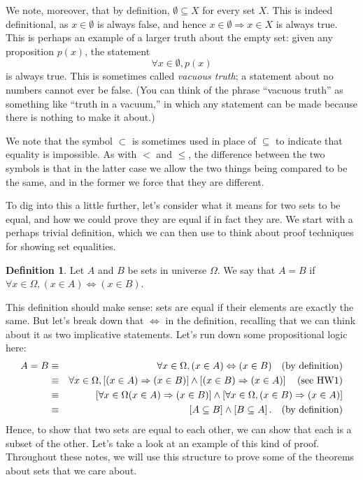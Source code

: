 \documentclass{article}
\theoremstyle{definition}
\newtheorem{definition}{Definition}
\newcommand{\ra}{\Rightarrow}
\renewcommand{\iff}{\Leftrightarrow}
\begin{document}
We note, moreover, that by definition, $\emptyset\subseteq X$ for every set $X$. This is indeed definitional, as $x\in\emptyset$ is always false, and hence $x\in\emptyset\ra x\in X$ is always true. This is perhaps an example of a larger truth about the empty set: given any proposition $p(x)$, the statement
\[\forall x\in\emptyset, p(x)\]
is always true. This is sometimes called {\it vacuous truth}; a statement about no numbers cannot ever be false. (You can think of the phrase ``vacuous truth'' as something like ``truth in a vacuum,'' in which any statement can be made because there is nothing to make it about.)

We note that the symbol $\subset$ is sometimes used in place of $\subseteq$ to indicate that equality is impossible. As with $<$ and $\leq$, the difference between the two symbols is that in the latter case we allow the two things being compared to be the same, and in the former we force that they are different. 

To dig into this a little further, let's consider what it means for two sets to be equal, and how we could prove they are equal if in fact they are. We start with a perhaps trivial definition, which we can then use to think about proof techniques for showing set equalities.

\begin{definition}
Let $A$ and $B$ be sets in universe $\Omega$. We say that $A=B$ if $\forall x\in\Omega, (x\in A) \iff (x\in B)$.
\end{definition}
This definition should make sense: sets are equal if their elements are exactly the same. But let's break down that $\iff$ in the definition, recalling that we can think about it as two implicative statements. Let's run down some propositional logic here:
\begin{eqnarray*}
A=B & \equiv & \forall x\in\Omega, (x\in A) \iff (x\in B) \quad \hbox{(by definition)}\\
& \equiv & \forall x\in \Omega, \left[(x\in A) \ra (x\in B)\right]\wedge\left[(x\in B) \ra (x\in A)\right]\quad \hbox{(see HW1)}\\
&\equiv & \left[\forall x\in \Omega(x\in A) \ra (x\in B)\right]\wedge\left[\forall x\in\Omega, (x\in B)\ra (x\in A)\right]\\
& \equiv & \left[A\subseteq B\right]\wedge\left[B\subseteq A\right].\quad \hbox{(by definition)}
\end{eqnarray*}
Hence, to show that two sets are equal to each other, we can show that each is a subset of the other. Let's take a look at an example of this kind of proof. Throughout these notes, we will use this structure to prove some of the theorems about sets that we care about.
\end{document}
